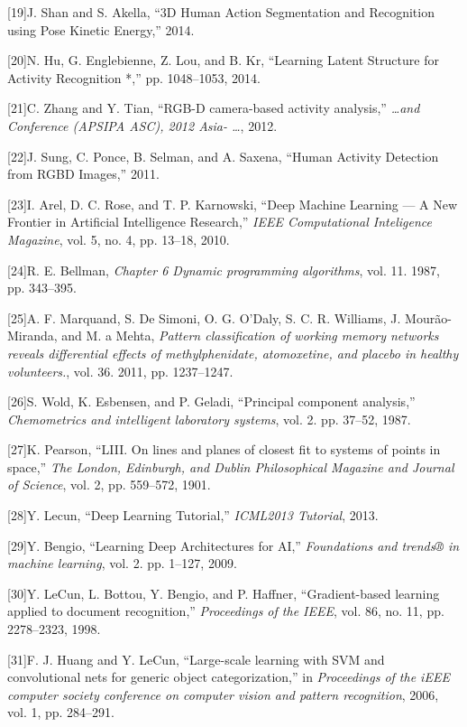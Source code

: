{[}19{]}J. Shan and S. Akella, ``3D Human Action Segmentation and
Recognition using Pose Kinetic Energy,'' 2014.

{[}20{]}N. Hu, G. Englebienne, Z. Lou, and B. Kr, ``Learning Latent
Structure for Activity Recognition *,'' pp. 1048--1053, 2014.

{[}21{]}C. Zhang and Y. Tian, ``RGB-D camera-based activity analysis,''
\emph{\ldots{}and Conference (APSIPA ASC), 2012 Asia- \ldots{}}, 2012.

{[}22{]}J. Sung, C. Ponce, B. Selman, and A. Saxena, ``Human Activity
Detection from RGBD Images,'' 2011.

{[}23{]}I. Arel, D. C. Rose, and T. P. Karnowski, ``Deep Machine
Learning --- A New Frontier in Artificial Intelligence Research,''
\emph{IEEE Computational Inteligence Magazine}, vol. 5, no. 4, pp.
13--18, 2010.

{[}24{]}R. E. Bellman, \emph{Chapter 6 Dynamic programming algorithms},
vol. 11. 1987, pp. 343--395.

{[}25{]}A. F. Marquand, S. {De Simoni}, O. G. O'Daly, S. C. R. Williams,
J. Mourão-Miranda, and M. a Mehta, \emph{Pattern classification of
working memory networks reveals differential effects of methylphenidate,
atomoxetine, and placebo in healthy volunteers.}, vol. 36. 2011, pp.
1237--1247.

{[}26{]}S. Wold, K. Esbensen, and P. Geladi, ``Principal component
analysis,'' \emph{Chemometrics and intelligent laboratory systems}, vol.
2. pp. 37--52, 1987.

{[}27{]}K. Pearson, ``LIII. On lines and planes of closest fit to
systems of points in space,'' \emph{The London, Edinburgh, and Dublin
Philosophical Magazine and Journal of Science}, vol. 2, pp. 559--572,
1901.

{[}28{]}Y. Lecun, ``Deep Learning Tutorial,'' \emph{ICML2013 Tutorial},
2013.

{[}29{]}Y. Bengio, ``Learning Deep Architectures for AI,''
\emph{Foundations and trends® in machine learning}, vol. 2. pp. 1--127,
2009.

{[}30{]}Y. LeCun, L. Bottou, Y. Bengio, and P. Haffner, ``Gradient-based
learning applied to document recognition,'' \emph{Proceedings of the
IEEE}, vol. 86, no. 11, pp. 2278--2323, 1998.

{[}31{]}F. J. Huang and Y. LeCun, ``Large-scale learning with SVM and
convolutional nets for generic object categorization,'' in
\emph{Proceedings of the iEEE computer society conference on computer
vision and pattern recognition}, 2006, vol. 1, pp. 284--291.

